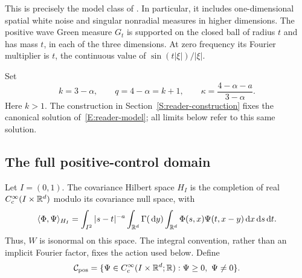 This is precisely the model class of . In particular,
it includes one-dimensional spatial white noise and singular nonradial measures
in higher dimensions. The positive wave Green measure $G_t$ is supported on the
closed ball of radius $t$ and has mass $t$, in each of the three dimensions. At
zero frequency its Fourier multiplier is $t$, the continuous value of
$\sin(t|\xi|)/|\xi|$.

Set
\begin{equation}\label{E:reader-exponents}
  k=3-\alpha,\qquad q=4-\alpha=k+1,\qquad
  \kappa=\frac{4-\alpha-a}{3-\alpha}.
\end{equation}
Here $k > 1$. The construction in Section~\ref{S:reader-construction} fixes the
canonical solution of~\eqref{E:reader-model}; all limits below refer to this
same solution.

\subsection{The full positive-control domain}

Let $I = (0,1)$. The covariance Hilbert space $H_I$ is the completion of real
$C_c^\infty(I\times\mathbb R^d)$ modulo its covariance null space, with
\begin{equation}\label{E:reader-raw-norm}
  \begin{split}
    \langle\Phi,\Psi\rangle_{H_I}
    =\int_{I^2}|s-t|^{-a}\int_{\mathbb R^d}\Gamma(\,\mathrm d y)
    \int_{\mathbb R^d}\Phi(s,x)\Psi(t,x-y)\,\mathrm d x\,\mathrm d s\,\mathrm d t.
  \end{split}
\end{equation}
Thus, $W$ is isonormal on this space. The integral convention, rather than an
implicit Fourier factor, fixes the action used below. Define
\begin{equation}\label{E:reader-positive-class}
  \mathcal C_{\mathrm{pos}}=\{\Psi\in C_c^\infty(I\times\mathbb R^d;\mathbb R):
  \Psi\ge0,\ \Psi\ne0\}.
\end{equation}

